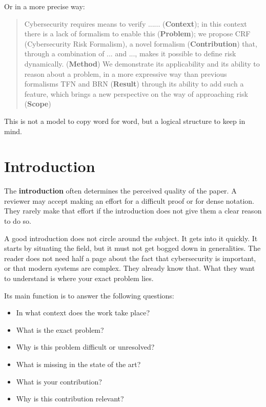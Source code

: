 \documentclass[11pt,a4paper]{article}
\theoremstyle{definition}
\begin{document}
Or in a more precise way:

\begin{quote}
Cybersecurity requires means to verify ...... (\textbf{Context}); in this context there is a lack of formalism to enable this (\textbf{Problem}); we propose CRF (Cybersecurity Risk Formalism), a novel formalism (\textbf{Contribution}) that, through a combination of ... and ..., makes it possible to define risk dynamically. (\textbf{Method}) We demonstrate its applicability and its ability to reason about a problem, in a more expressive way than previous formalisms TFN and BRN (\textbf{Result}) through its ability to add such a feature, which brings a new perspective on the way of approaching risk (\textbf{Scope})
\end{quote}

This is not a model to copy word for word, but a logical structure to keep in mind.

\section{Introduction}

The \textbf{introduction} often determines the perceived quality of the paper. A reviewer may accept making an effort for a difficult proof or for dense notation. They rarely make that effort if the introduction does not give them a clear reason to do so.

A good introduction does not circle around the subject. It gets into it quickly. It starts by situating the field, but it must not get bogged down in generalities. The reader does not need half a page about the fact that cybersecurity is important, or that modern systems are complex. They already know that. What they want to understand is where your exact problem lies.

Its main function is to answer the following questions:
\begin{itemize}
    \item In what context does the work take place?
    \item What is the exact problem?
    \item Why is this problem difficult or unresolved?
    \item What is missing in the state of the art?
    \item What is your contribution?
    \item Why is this contribution relevant?
\end{itemize}
\end{document}
